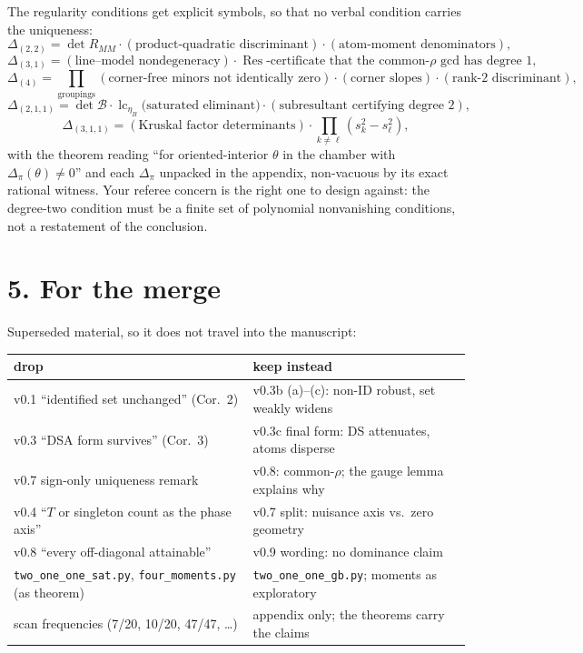 \documentclass[11pt]{article}
\theoremstyle{remark}
\begin{document}
The regularity conditions get explicit symbols, so that no verbal condition carries the uniqueness:
\[
\Delta_{(2,2)}=\det R_{MM}\cdot(\text{product-quadratic discriminant})\cdot(\text{atom-moment denominators}),
\]
\[
\Delta_{(3,1)}=(\text{line--model nondegeneracy})\cdot\operatorname{Res}\text{-certificate that the common-}\rho\text{ gcd has degree }1,
\]
\[
\Delta_{(4)}=\textstyle\prod_{\text{groupings}}(\text{corner-free minors not identically zero})\cdot(\text{corner slopes})\cdot(\text{rank-2 discriminant}),
\]
\[
\Delta_{(2,1,1)}=\det\mathcal B\cdot\operatorname{lc}_{\eta_B}\bigl(\text{saturated eliminant}\bigr)\cdot(\text{subresultant certifying degree }2),
\]
\[
\Delta_{(3,1,1)}=(\text{Kruskal factor determinants})\cdot\textstyle\prod_{k\neq\ell}(s_k^2-s_\ell^2),
\]
with the theorem reading ``for oriented-interior $\theta$ in the chamber with $\Delta_\pi(\theta)\neq0$'' and each $\Delta_\pi$ unpacked in the appendix, non-vacuous by its exact rational witness. Your referee concern is the right one to design against: the degree-two condition must be a finite set of polynomial nonvanishing conditions, not a restatement of the conclusion.

\section*{5. For the merge}

Superseded material, so it does not travel into the manuscript:
\begin{center}\small
\begin{tabular}{@{}ll@{}}
\toprule
drop & keep instead\\
\midrule
v0.1 ``identified set unchanged'' (Cor.~2) & v0.3b (a)--(c): non-ID robust, set weakly widens\\
v0.3 ``DSA form survives'' (Cor.~3) & v0.3c final form: DS attenuates, atoms disperse\\
v0.7 sign-only uniqueness remark & v0.8: common-$\rho$; the gauge lemma explains why\\
v0.4 ``$T$ or singleton count as the phase axis'' & v0.7 split: nuisance axis vs.\ zero geometry\\
v0.8 ``every off-diagonal attainable'' & v0.9 wording: no dominance claim\\
\texttt{two\_one\_one\_sat.py}, \texttt{four\_moments.py} (as theorem) & \texttt{two\_one\_one\_gb.py}; moments as exploratory\\
scan frequencies (7/20, 10/20, 47/47, \dots) & appendix only; the theorems carry the claims\\
\bottomrule
\end{tabular}
\end{center}
\end{document}

